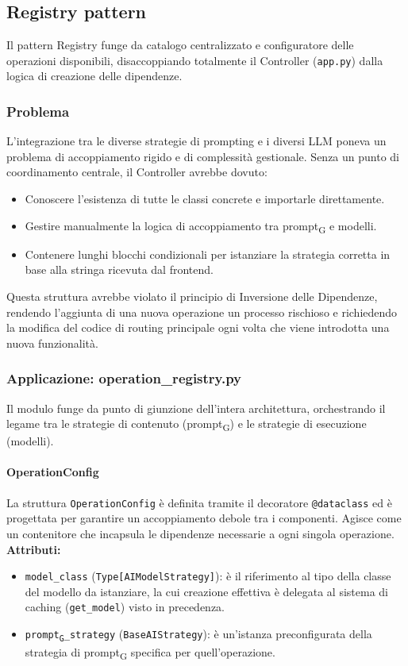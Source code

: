 \documentclass[11pt,a4paper]{article}
\newcommand{\gls}[1]{#1\textsubscript{G}}
\begin{document}
\newpage

\subsection{Registry pattern}
Il pattern Registry funge da catalogo centralizzato e configuratore delle operazioni disponibili, disaccoppiando totalmente il Controller (\texttt{app.py}) dalla logica di creazione delle dipendenze.

\subsubsection{Problema}
L’integrazione tra le diverse strategie di prompting e i diversi LLM poneva un problema di accoppiamento rigido e di complessità gestionale. Senza un punto di coordinamento centrale, il Controller avrebbe dovuto:
\begin{itemize}
    \item Conoscere l'esistenza di tutte le classi concrete e importarle direttamente.
    \item Gestire manualmente la logica di accoppiamento tra \gls{prompt} e modelli.
    \item Contenere lunghi blocchi condizionali per istanziare la strategia corretta in base alla stringa ricevuta dal frontend.
\end{itemize}
Questa struttura avrebbe violato il principio di Inversione delle Dipendenze, rendendo l'aggiunta di una nuova operazione un processo rischioso e richiedendo la modifica del codice di routing principale ogni volta che viene introdotta una nuova funzionalità.

\subsubsection{Applicazione: operation\_registry.py}
Il modulo funge da punto di giunzione dell'intera architettura, orchestrando il legame tra le strategie di contenuto (\gls{prompt}) e le strategie di esecuzione (modelli).

\paragraph{OperationConfig} 
La struttura \texttt{OperationConfig} è definita tramite il decoratore \texttt{@dataclass} ed è progettata per garantire un accoppiamento debole tra i componenti. Agisce come un contenitore che incapsula le dipendenze necessarie a ogni singola operazione.\\
\textbf{Attributi:}
\begin{itemize}
    \item \texttt{model\_class} (\texttt{Type[AIModelStrategy]}): è il riferimento al tipo della classe del modello da istanziare, la cui creazione effettiva è delegata al sistema di caching (\texttt{get\_model}) visto in precedenza.
    \item \texttt{\gls{prompt}\_strategy} (\texttt{BaseAIStrategy}): è un'istanza preconfigurata della strategia di \gls{prompt} specifica per quell'operazione.
\end{itemize}
\end{document}
